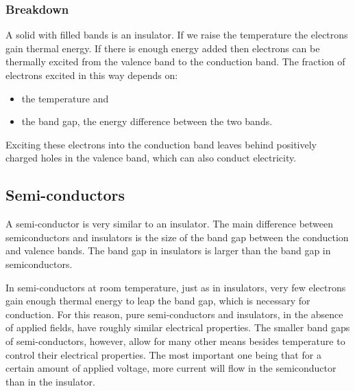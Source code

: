 \subsubsection{Breakdown}

A solid with filled bands is an insulator. If we raise the temperature the electrons gain thermal energy. If there is enough energy added then electrons can be thermally excited from the valence band to the conduction band. The fraction of electrons excited in this way depends on:
\begin{itemize}
\item the temperature and
\item the band gap, the energy difference between the two bands. 
\end{itemize}
Exciting these electrons into the conduction band leaves behind positively charged holes in the valence band, which can also conduct electricity.

\subsection{Semi-conductors}

A semi-conductor is very similar to an insulator. The main difference between semiconductors and insulators is the size of the band gap between the conduction and valence bands. The band gap in insulators is larger than the band gap in semiconductors. 

In semi-conductors at room temperature, just as in insulators, very few electrons gain enough thermal energy to leap the band gap, which is necessary for conduction. For this reason, pure semi-conductors and insulators, in the absence of applied fields, have roughly similar electrical properties. The smaller band gaps of semi-conductors, however, allow for many other means besides temperature to control their electrical properties. The most important one being that for a certain amount of applied voltage, more current will flow in the semiconductor than in the insulator.


